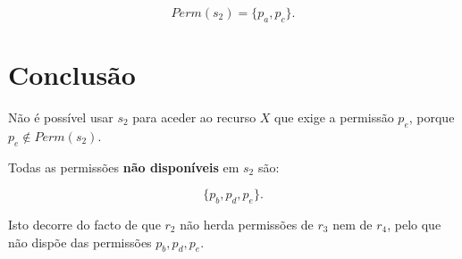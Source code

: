\[
Perm(s_2) = \{p_a, p_c\}.
\]

\section{Conclusão}

Não é possível usar \(s_2\) para aceder ao recurso \(X\) que exige a permissão \(p_e\), porque \(p_e \notin Perm(s_2)\).  

Todas as permissões \textbf{não disponíveis} em \(s_2\) são:

\[
\{p_b, p_d, p_e\}.
\]

Isto decorre do facto de que \(r_2\) não herda permissões de \(r_3\) nem de \(r_4\), pelo que não dispõe das permissões \(p_b, p_d, p_e\).